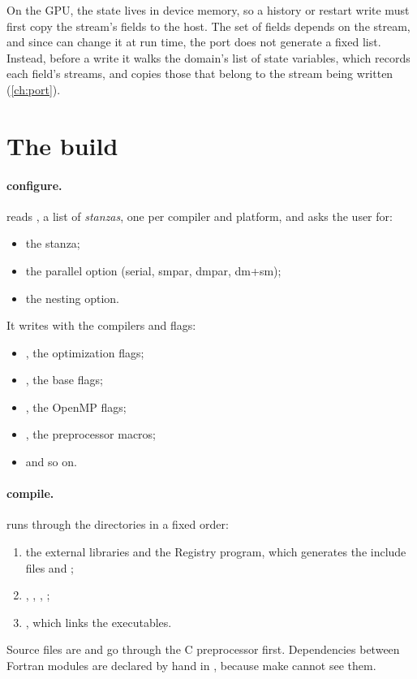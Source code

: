 \begin{portnote}
On the GPU, the state lives in device memory, so a history or restart write must first copy the stream's fields to
the host. The set of fields depends on the stream, and since  can change it at run time, the
port does not generate a fixed list. Instead, before a write it walks the domain's list of state variables, which
records each field's streams, and copies those that belong to the stream being written (\cref{ch:port}).
\end{portnote}

\section{The build}

\paragraph{configure.}  reads , a list of \emph{stanzas}, one per
compiler and platform, and asks the user for:
\begin{itemize}
  \item the stanza;
  \item the parallel option (serial, smpar, dmpar, dm+sm);
  \item the nesting option.
\end{itemize}
It writes  with the compilers and flags:
\begin{itemize}
  \item {}, the optimization flags;
  \item {}, the base flags;
  \item {}, the OpenMP flags;
  \item {}, the preprocessor macros;
  \item and so on.
\end{itemize}

\paragraph{compile.}  runs  through the directories in a fixed order:
\begin{enumerate}
  \item the external libraries and the Registry program, which generates the include files and
    ;
  \item {}, , , ;
  \item {}, which links the executables.
\end{enumerate}
Source files are  and go through the C preprocessor first. Dependencies between Fortran modules are declared
by hand in , because make cannot see them.

